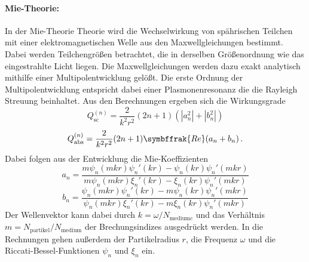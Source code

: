 \paragraph{Mie-Theorie:}
In der Mie-Theorie Theorie wird die Wechselwirkung von spährischen Teilchen mit einer elektromagnetischen Welle aus den Maxwellgleichungen bestimmt. Dabei werden Teilchengrößen betrachtet, die in derselben Größenordnung wie das eingestrahlte Licht liegen. Die Maxwellgleichungen werden dazu exakt analytisch mithilfe einer Multipolentwicklung gelößt. Die erste Ordnung der Multipolentwicklung entspricht dabei einer Plasmonenresonanz die die Rayleigh Streuung beinhaltet. Aus den Berechnungen ergeben sich die Wirkungsgrade
\begin{equation}
  Q^{(n)}_{\text{sc}} = \frac{2}{k^2r^2} (2n+1)(|a_n^2| + |b_n^2|)
  \label{eqn:sc}
\end{equation}
\begin{equation}
  Q^{(n)}_{\text{abs}} = \frac{2}{k^2r^2} (2n+1) \symbffrak{Re}(a_n+b_n)\,.
  \label{eqn:abs}
\end{equation}
Dabei folgen aus der Entwicklung die Mie-Koeffizienten
\begin{equation}
  a_n = \frac{m\psi_n(mkr)\psi_n'(kr)-\psi_n(kr)\psi_n'(mkr)}{m\psi_n(mkr)\xi_n'(kr)-\xi_n(kr)\psi_n'(mkr)}
\end{equation}
\begin{equation}
  b_n = \frac{\psi_n(mkr)\psi_n'(kr)-m\psi_n(kr)\psi_n'(mkr)}{\psi_n(mkr)\xi_n'(kr)-m\xi_n(kr)\psi_n'(mkr)}
\end{equation}
Der Wellenvektor kann dabei durch  $k=\omega/N_{\text{medium} c}$ und das Verhältnis $m = N_\text{partikel}/N_\text{medium}$ der Brechungsindizes ausgedrückt werden. In die Rechnungen gehen außerdem der Partikelradius $r$, die Frequenz $\omega$ und die Riccati-Bessel-Funktionen $\psi_n$ und $\xi_n$ ein. \cite{hoeflich} \cite{anleitung}

